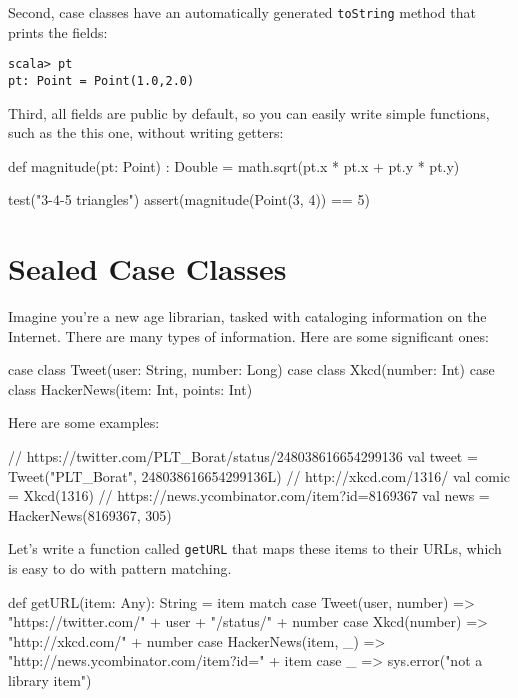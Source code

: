 \documentclass{book}
\begin{document}
Second, case classes have an automatically generated \verb|toString| method that
prints the fields:

\begin{verbatim}
scala> pt
pt: Point = Point(1.0,2.0)
\end{verbatim}

Third, all fields are public by default, so you can easily write simple
functions, such as the this one, without writing getters:

\begin{scalacode}
def magnitude(pt: Point) : Double = {
  math.sqrt(pt.x * pt.x + pt.y * pt.y)
}

test("3-4-5 triangles") {
  assert(magnitude(Point(3, 4)) == 5)
}
\end{scalacode}

\section{Sealed Case Classes}

Imagine you're a new age librarian, tasked with cataloging information on the
Internet. There are many types of information. Here are some significant ones:

\begin{scalacode}
case class Tweet(user: String, number: Long)
case class Xkcd(number: Int)
case class HackerNews(item: Int, points: Int)
\end{scalacode}

Here are some examples:

\begin{scalacode}
// https://twitter.com/PLT_Borat/status/248038616654299136
val tweet = Tweet("PLT_Borat", 248038616654299136L)
// http://xkcd.com/1316/
val comic = Xkcd(1316)
// https://news.ycombinator.com/item?id=8169367
val news = HackerNews(8169367, 305)
\end{scalacode}

Let's write a function called \verb|getURL| that maps these items to their URLs,
which is easy to do with pattern matching.

\begin{scalacode}
def getURL(item: Any): String = item match {
  case Tweet(user, number) => "https://twitter.com/" + user + "/status/" + number
  case Xkcd(number) => "http://xkcd.com/" + number
  case HackerNews(item, _) => "http://news.ycombinator.com/item?id=" + item
  case _ => sys.error("not a library item")
}
\end{scalacode}
\end{document}
